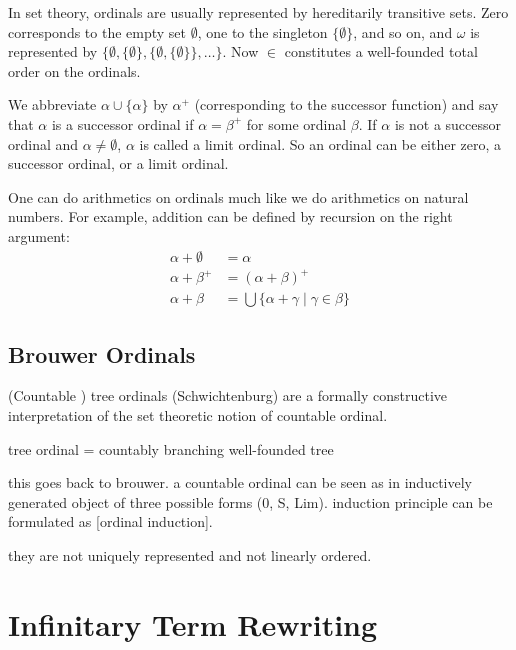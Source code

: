 \documentclass[11pt,oneside,a4paper,final]{report}
\theoremstyle{definition}
\begin{document}
In set theory, ordinals are usually represented by hereditarily transitive
sets. Zero corresponds to the empty set $\emptyset$, one to the singleton $\{
\emptyset \}$, and so on, and $\omega$ is represented by $\{ \emptyset, \{
\emptyset \}, \{ \emptyset, \{ \emptyset \} \} , \ldots \}$. Now $\in$
constitutes a well-founded total order on the ordinals.

We abbreviate $\alpha \cup \{ \alpha \}$ by $\alpha^+$ (corresponding to the
successor function) and say that $\alpha$ is a successor ordinal if $\alpha =
\beta^+$ for some ordinal $\beta$. If $\alpha$ is not a successor ordinal and
$\alpha \neq \emptyset$, $\alpha$ is called a limit ordinal. So an ordinal can
be either zero, a successor ordinal, or a limit ordinal.

One can do arithmetics on ordinals much like we do arithmetics on natural
numbers. For example, addition can be defined by recursion on the right
argument:
\begin{align*}
  \alpha + \emptyset &= \alpha\\
  \alpha + \beta^+   &= (\alpha + \beta)^+\\
  \alpha + \beta     &= \bigcup \{ \alpha + \gamma \; | \; \gamma \in \beta \}
\end{align*}


\subsection{Brouwer Ordinals}

(Countable ) tree ordinals (Schwichtenburg) are a formally constructive
interpretation of the set theoretic notion of countable ordinal.

tree ordinal = countably branching well-founded tree

this goes back to brouwer. a countable ordinal can be seen as in inductively
generated object of three possible forms (0, S, Lim). induction principle can
be formulated as [ordinal induction].

they are not uniquely represented and not linearly ordered.


\section{Infinitary Term Rewriting}\label{sec:itr}
\end{document}
